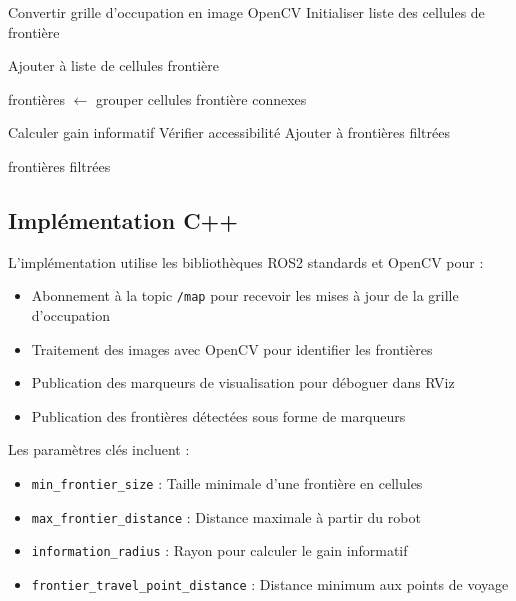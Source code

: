\documentclass[12pt,a4paper,oneside]{report}
\begin{document}
\begin{algorithm}[H]
\caption{Détection des Frontières}
\begin{algorithmic}
  \State Convertir grille d'occupation en image OpenCV
  \State Initialiser liste des cellules de frontière
  
      \State Ajouter à liste de cellules frontière
    \EndIf
  \EndFor
  
  \State frontières $\leftarrow$ grouper cellules frontière connexes
  
      \State Calculer gain informatif
      \State Vérifier accessibilité
        \State Ajouter à frontières filtrées
      \EndIf
    \EndIf
  \EndFor
  
  \State \Return frontières filtrées
\end{algorithmic}
\end{algorithm}

\subsection{Implémentation C++}

L'implémentation utilise les bibliothèques ROS2 standards et OpenCV pour :

\begin{itemize}
  \item Abonnement à la topic \texttt{/map} pour recevoir les mises à jour de la grille d'occupation
  \item Traitement des images avec OpenCV pour identifier les frontières
  \item Publication des marqueurs de visualisation pour déboguer dans RViz
  \item Publication des frontières détectées sous forme de marqueurs
\end{itemize}

Les paramètres clés incluent :
\begin{itemize}
  \item \texttt{min\_frontier\_size} : Taille minimale d'une frontière en cellules
  \item \texttt{max\_frontier\_distance} : Distance maximale à partir du robot
  \item \texttt{information\_radius} : Rayon pour calculer le gain informatif
  \item \texttt{frontier\_travel\_point\_distance} : Distance minimum aux points de voyage
\end{itemize}
\end{document}

